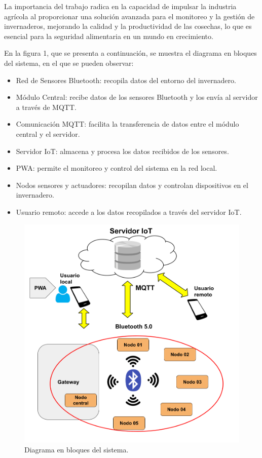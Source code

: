 \documentclass[
11pt, %
]{charter}
\begin{document}
La importancia del trabajo radica en la capacidad de impulsar la industria agrícola al proporcionar una solución avanzada para el monitoreo y la gestión de invernaderos, mejorando la calidad y la productividad de las cosechas, lo que es esencial para la seguridad alimentaria en un mundo en crecimiento.

En la figura 1, que se presenta a continuación, se muestra el diagrama en bloques del sistema, en el que se pueden observar:

\begin{itemize}
	\item Red de Sensores Bluetooth: recopila datos del entorno del invernadero.
	\item Módulo Central: recibe datos de los sensores Bluetooth y los envía al servidor a través de MQTT.
	\item Comunicación MQTT: facilita la transferencia de datos entre el módulo central y el servidor.
	\item Servidor IoT: almacena y procesa los datos recibidos de los sensores.
	\item PWA: permite el monitoreo y control del sistema en la red local.
	\item Nodos sensores y actuadores: recopilan datos y controlan dispositivos en el invernadero.
	\item Usuario remoto: accede a los datos recopilados a través del servidor IoT.
\end{itemize}


\begin{figure}[htpb]
\centering 
\includegraphics[width=.6\textwidth]{./Figuras/DiagramaNuevo.png}
\caption{Diagrama en bloques del sistema.}
\label{fig:diagBloques}
\end{figure}
\end{document}
